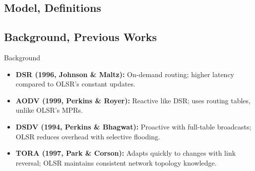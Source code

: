 \documentclass[11pt]{beamer}              %
\begin{document}
\subsection{Model, Definitions}


\subsection{}

\subsection{Background, Previous Works}
\begin{frame}{Background}
    \begin{itemize}
        \item \textbf{DSR (1996, Johnson \& Maltz):} On-demand routing; higher latency compared to OLSR's constant updates.
        \item \textbf{AODV (1999, Perkins \& Royer):} Reactive like DSR; uses routing tables, unlike OLSR's MPRs.
        \item \textbf{DSDV (1994, Perkins \& Bhagwat):} Proactive with full-table broadcasts; OLSR reduces overhead with selective flooding.
        \item \textbf{TORA (1997, Park \& Corson):} Adapts quickly to changes with link reversal; OLSR maintains consistent network topology knowledge.
    \end{itemize}
\end{frame}
\end{document}
